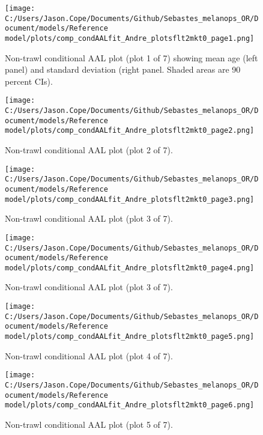 \documentclass[11pt,
  english,
  letterpaper,
]{article}
\begin{document}
\begin{figure}
\centering
\texttt{[image: C:/Users/Jason.Cope/Documents/Github/Sebastes\_melanops\_OR/Document/models/Reference model/plots/comp\_condAALfit\_Andre\_plotsflt2mkt0\_page1.png]}
\caption{Non-trawl conditional AAL plot (plot 1 of 7) showing mean age (left panel) and standard deviation (right panel. Shaded areas are 90 percent CIs).\label{fig:comp_condAALfit_Andre_plotsflt2mkt0_page1}}
\end{figure}

\begin{figure}
\centering
\texttt{[image: C:/Users/Jason.Cope/Documents/Github/Sebastes\_melanops\_OR/Document/models/Reference model/plots/comp\_condAALfit\_Andre\_plotsflt2mkt0\_page2.png]}
\caption{Non-trawl conditional AAL plot (plot 2 of 7).\label{fig:comp_condAALfit_Andre_plotsflt2mkt0_page2}}
\end{figure}

\begin{figure}
\centering
\texttt{[image: C:/Users/Jason.Cope/Documents/Github/Sebastes\_melanops\_OR/Document/models/Reference model/plots/comp\_condAALfit\_Andre\_plotsflt2mkt0\_page3.png]}
\caption{Non-trawl conditional AAL plot (plot 3 of 7).\label{fig:comp_condAALfit_Andre_plotsflt2mkt0_page3}}
\end{figure}

\begin{figure}
\centering
\texttt{[image: C:/Users/Jason.Cope/Documents/Github/Sebastes\_melanops\_OR/Document/models/Reference model/plots/comp\_condAALfit\_Andre\_plotsflt2mkt0\_page4.png]}
\caption{Non-trawl conditional AAL plot (plot 3 of 7).\label{fig:comp_condAALfit_Andre_plotsflt2mkt0_page4}}
\end{figure}

\begin{figure}
\centering
\texttt{[image: C:/Users/Jason.Cope/Documents/Github/Sebastes\_melanops\_OR/Document/models/Reference model/plots/comp\_condAALfit\_Andre\_plotsflt2mkt0\_page5.png]}
\caption{Non-trawl conditional AAL plot (plot 4 of 7).\label{fig:comp_condAALfit_Andre_plotsflt2mkt0_page5}}
\end{figure}

\begin{figure}
\centering
\texttt{[image: C:/Users/Jason.Cope/Documents/Github/Sebastes\_melanops\_OR/Document/models/Reference model/plots/comp\_condAALfit\_Andre\_plotsflt2mkt0\_page6.png]}
\caption{Non-trawl conditional AAL plot (plot 5 of 7).\label{fig:comp_condAALfit_Andre_plotsflt2mkt0_page6}}
\end{figure}
\end{document}
